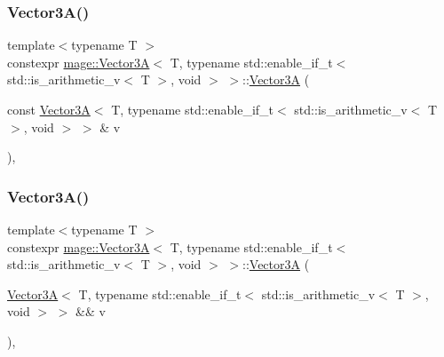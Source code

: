 \subsubsection{\texorpdfstring{Vector3\+A()}{Vector3A()}\hspace{0.1cm}{\footnotesize\ttfamily [5/8]}}
{\footnotesize\ttfamily template$<$typename T $>$ \\
constexpr \hyperlink{structmage_1_1_vector3_a}{mage\+::\+Vector3A}$<$ T, typename std\+::enable\+\_\+if\+\_\+t$<$ std\+::is\+\_\+arithmetic\+\_\+v$<$ T $>$, void $>$ $>$\+::\hyperlink{structmage_1_1_vector3_a}{Vector3A} (\begin{DoxyParamCaption}\item[{const \hyperlink{structmage_1_1_vector3_a}{Vector3A}$<$ T, typename std\+::enable\+\_\+if\+\_\+t$<$ std\+::is\+\_\+arithmetic\+\_\+v$<$ T $>$, void $>$ $>$ \&}]{v }\end{DoxyParamCaption})\hspace{0.3cm}{\ttfamily [default]}, {\ttfamily [noexcept]}}

\hypertarget{structmage_1_1_vector3_a_3_01_t_00_01typename_01std_1_1enable__if__t_3_01std_1_1is__arithmetic__7070ab83646a86866d1e3c9d7eeea37a_adc6c9732fa65b928298b56423e7dc340}{}\label{structmage_1_1_vector3_a_3_01_t_00_01typename_01std_1_1enable__if__t_3_01std_1_1is__arithmetic__7070ab83646a86866d1e3c9d7eeea37a_adc6c9732fa65b928298b56423e7dc340} 
\subsubsection{\texorpdfstring{Vector3\+A()}{Vector3A()}\hspace{0.1cm}{\footnotesize\ttfamily [6/8]}}
{\footnotesize\ttfamily template$<$typename T $>$ \\
constexpr \hyperlink{structmage_1_1_vector3_a}{mage\+::\+Vector3A}$<$ T, typename std\+::enable\+\_\+if\+\_\+t$<$ std\+::is\+\_\+arithmetic\+\_\+v$<$ T $>$, void $>$ $>$\+::\hyperlink{structmage_1_1_vector3_a}{Vector3A} (\begin{DoxyParamCaption}\item[{\hyperlink{structmage_1_1_vector3_a}{Vector3A}$<$ T, typename std\+::enable\+\_\+if\+\_\+t$<$ std\+::is\+\_\+arithmetic\+\_\+v$<$ T $>$, void $>$ $>$ \&\&}]{v }\end{DoxyParamCaption})\hspace{0.3cm}{\ttfamily [default]}, {\ttfamily [noexcept]}}


